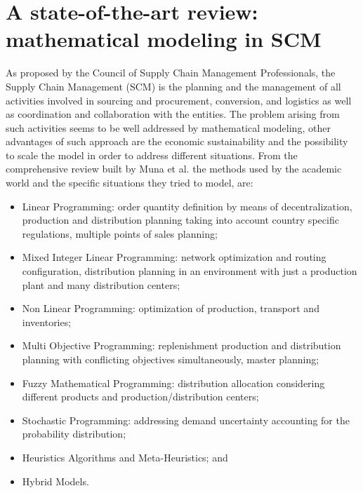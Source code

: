 \documentclass{article}
\begin{document}
\section{A state-of-the-art review: mathematical modeling in SCM}
  As proposed by the Council of Supply Chain Management Professionals, the Supply Chain Management (SCM) is the planning and the management of all activities involved in sourcing and procurement, conversion, and logistics as well as coordination and collaboration with the entities. The problem arising from such activities seems to be well addressed by mathematical modeling, other advantages of such approach are the economic sustainability and the possibility to scale the model in order to address different situations.
  From the comprehensive review built by Muna et al. \cite{mula_mathematical_2010} the methods used by the academic world and the specific situations they tried to model, are:
  \begin{itemize}
	  \item Linear Programming: order quantity definition by means of decentralization\cite{jung_order_2008}, production and distribution planning taking into account country specific regulations\cite{Oh_Karimi_2006}, multiple points of sales planning\cite{Kanyalkar_2005};
	  \item Mixed Integer Linear Programming: network optimization and routing configuration\cite{romo_optimizing_2009}, distribution planning in an environment with just a production plant and many distribution centers\cite{Rizk_Martel2008};
    \item Non Linear Programming: optimization of production, transport and inventories\cite{benjamin_analysis_1989};
    \item Multi Objective Programming: replenishment production and distribution planning with conflicting objectives simultaneously\cite{torabi_interactive_2008}, master planning\cite{Chern_Hsieh_2007};
    \item Fuzzy Mathematical Programming: distribution allocation considering different products and production/distribution centers\cite{Liang_Cheng_2009};
    \item Stochastic Programming: addressing demand uncertainty accounting for the probability distribution\cite{Gupta_Maranas_2003};
    \item Heuristics Algorithms and Meta-Heuristics; and
    \item Hybrid Models.
  \end{itemize}
\end{document}
